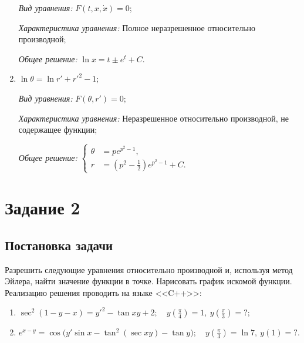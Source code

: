 \documentclass[14pt, a4paper, titlepage, fleqn]{extarticle}
\begin{document}
\begin{enumerate}
                    \textit{Вид уравнения:} \( F \left( t, x, \dot{x} \right) = 0; \)

                    \textit{Характеристика уравнения:}
                        Полное неразрешенное относительно производной;

                    \textit{Общее решение:} \( \ln{x} = t \pm e^t + C. \)

                
                \item \( \ln{\theta} = \ln{r'} + r'^2 - 1; \)
                
                    \textit{Вид уравнения:} \( F \left( \theta, r' \right) = 0; \)

                    \textit{Характеристика уравнения:}
                        Неразрешенное относительно производной, не содержащее функции;

                    \textit{Общее решение:}
                        \(
                            \left\lbrace
                                \begin{aligned}
                                    \theta &= p e^{p^2-1}, \\
                                    r &= \left( p^2 - \frac{1}{2} \right) e^{p^2-1} + C.
                                \end{aligned}
                            \right.    
                        \)

            \end{enumerate}

            
    \pagebreak

    \section{Задание 2}
        \subsection{Постановка задачи}
            Разрешить следующие уравнения относительно производной и, 
            используя метод Эйлера, найти значение функции в точке. 
            Нарисовать график искомой функции. 
            Реализацию решения проводить на языке <<C++>>:

            \begin{enumerate}
                \item \( \sec^2{(1 -y- x)} = y'^2 - \tan{xy} + 2; \quad y \left( \frac{\pi}{4} \right) = 1, ~ y \left( \frac{\pi}{3} \right) = ?;  \)
                \item \( e^{x-y} = \cos\big( y' \sin{x} - \tan^2(\sec{xy}) - \tan{y} \big); \quad y \left( \frac{\pi}{3} \right) = \ln 7, ~ y(1) = ?. \)
            \end{enumerate}
\end{document}
